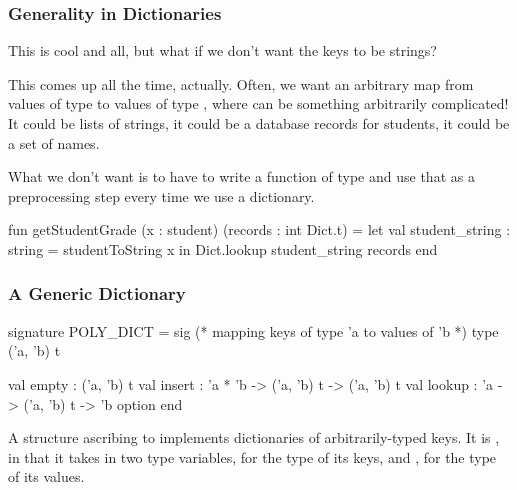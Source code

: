 \documentclass[aspectratio=169, handout]{beamer}
\begin{document}

\begin{frame}[fragile]
  \frametitle{Generality in Dictionaries}

  This is cool and all, but what if we don't want the keys to be strings?

  \pause
  \vspace{\fill}

  This comes up all the time, actually. Often, we want an arbitrary map
  from values of type  to values of type , where
   can be something arbitrarily complicated! It could be lists of
  strings, it could be a database records for students, it could be a set
  of names.

  \pause
  \vspace{\fill}

  What we don't want is to have to write a function of type 
  and use that as a preprocessing step every time we use a dictionary.

  \pause
  \vspace{\fill}

  \begin{codeblock}
    fun getStudentGrade (x : student) (records : int Dict.t) =
      let
        val student_string : string = studentToString x
      in
        Dict.lookup student_string records
      end
  \end{codeblock}
\end{frame}

\begin{frame}[fragile]
  \frametitle{A Generic Dictionary}

  \begin{codeblock}
    signature POLY_DICT =
      sig
        (* mapping keys of type 'a to values of 'b *)
        type ('a, 'b) t

        val empty : ('a, 'b) t
        val insert : 'a * 'b -> ('a, 'b) t -> ('a, 'b) t
        val lookup : 'a -> ('a, 'b) t -> 'b option
      end
  \end{codeblock}

  \pause
  \vspace{\fill}

  A structure ascribing to  implements dictionaries of
  arbitrarily-typed keys. It is , in that it
  takes in two type variables,  for the type of its keys, and
  , for the type of its values.
\end{frame}
\end{document}
